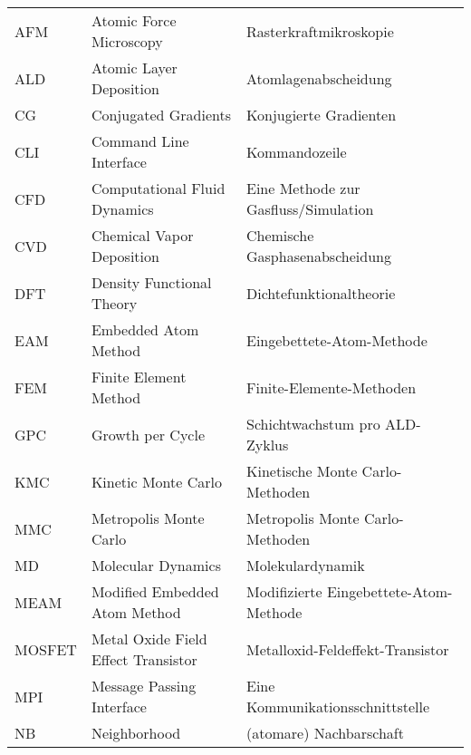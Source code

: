 \def\arraystretch{1.3}
\begin{longtable}{lll}

AFM       & Atomic Force Microscopy             & Rasterkraftmikroskopie                                      \\
ALD       & Atomic Layer Deposition             & Atomlagenabscheidung                                        \\
CG        & Conjugated Gradients                & Konjugierte Gradienten                                      \\
CLI       & Command Line Interface              & Kommandozeile                                               \\
CFD       & Computational Fluid Dynamics        & Eine Methode zur Gasfluss/Simulation                        \\
CVD       & Chemical Vapor Deposition           & Chemische Gasphasenabscheidung                              \\
DFT       & Density Functional Theory           & Dichtefunktionaltheorie                                     \\
EAM       & Embedded Atom Method                & Eingebettete-Atom-Methode                                   \\
FEM       & Finite Element Method               & Finite-Elemente-Methoden                                    \\
GPC       & Growth per Cycle                    & Schichtwachstum pro ALD-Zyklus                              \\
KMC       & Kinetic Monte Carlo                 & Kinetische Monte Carlo-Methoden                             \\
MMC       & Metropolis Monte Carlo              & Metropolis Monte Carlo-Methoden                             \\
MD        & Molecular Dynamics                  & Molekulardynamik                                            \\
MEAM      & Modified Embedded Atom Method       & Modifizierte Eingebettete-Atom-Methode                      \\
MOSFET    & Metal Oxide Field Effect Transistor & Metalloxid-Feldeffekt-Transistor                            \\
MPI       & Message Passing Interface           & Eine Kommunikationsschnittstelle                            \\
NB        & Neighborhood                        & (atomare) Nachbarschaft                                     \\

\end{longtable}
